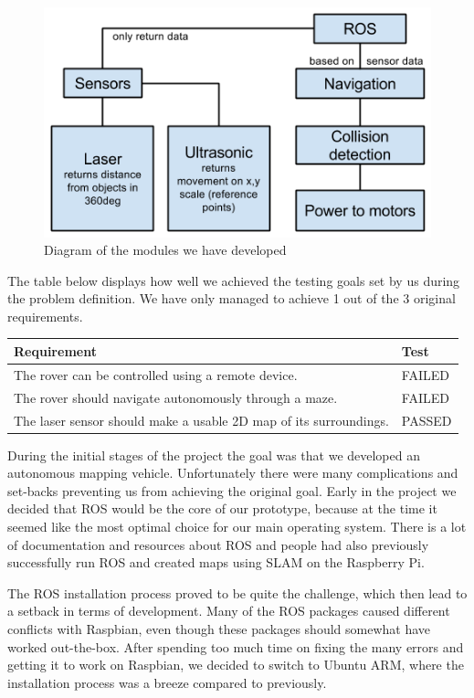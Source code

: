 \begin{figure}[H]
	\centering
	\includegraphics[scale=.5]{images/developmentdiagram2.png}
	\caption{Diagram of the modules we have developed}
	\label{fig:developmentdiagram2}
\end{figure}

The table below displays how well we achieved the testing goals set by us during the problem definition. We have only managed to achieve 1 out of the 3 original requirements.

\begin{table}[H]
	\centering
	\begin{tabular}{|l|l|}
		\hline
		\textbf{Requirement} & \textbf{Test} \\ \hline
		The rover can be controlled using a remote device. & FAILED \\ \hline
		The rover should navigate autonomously through a maze. & FAILED \\ \hline
		The laser sensor should make a usable 2D map of its surroundings. & PASSED\\ \hline
	\end{tabular}
\end{table}

During the initial stages of the project the goal was that we developed an autonomous mapping vehicle. Unfortunately there were many complications and set-backs preventing us from achieving the original goal. 
Early in the project we decided that ROS would be the core of our prototype, because at the time it seemed like the most optimal choice for our main operating system. There is a lot of documentation and resources about ROS and people had also previously successfully run ROS and created maps using SLAM on the Raspberry Pi.

The ROS installation process proved to be quite the challenge, which then lead to a setback in terms of development. Many of the ROS packages caused different conflicts with Raspbian, even though these packages should somewhat have worked out-the-box. After spending too much time on fixing the many errors and getting it to work on Raspbian, we decided to switch to Ubuntu ARM, where the installation process was a breeze compared to previously.

